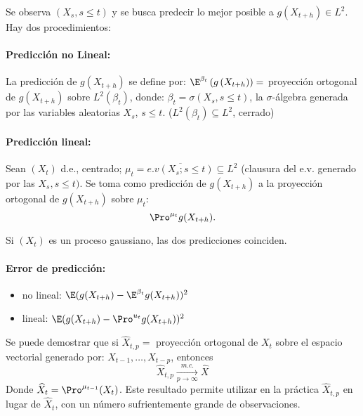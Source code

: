 Se observa $\left( {X_{s} ,s\le t} \right)$ y se busca predecir lo mejor 
posible a $g\left( {X_{t+h} } \right)\in L^{2}$. Hay dos procedimientos:

\paragraph{Predicci\'{o}n no Lineal:}
La predicci\'{o}n de $g\left( {X_{t+h} } \right)$ se define por:
$\E^{\beta_{t} }\left( {g\left( {X_{t+h} } \right)} \right)=$ 
proyecci\'{o}n ortogonal de $g\left( {X_{t+h} } \right)$ sobre $L^{2}\left( 
{\beta_{t} } \right)$, donde: $\beta_{t} =\sigma (X_{s} ,s\leq t)$, la 
$\sigma$-\'{a}lgebra generada por las variables aleatorias $X_{s} $, $s\leq 
t.$ ($L^{2}\left( {\beta_{t} } \right)\subseteq L^{2}$, cerrado)

\paragraph{Predicci\'{o}n lineal:}
Sean $(X_{t} )$ d.e., centrado; $\mu_{t} =\overline {e.v(X_{s} ;s\leq t)} 
\subseteq L^{2}$ (clausura del e.v. generado por las $X_{s} ,s\leq t)$. Se 
toma como predicci\'{o}n de $g(X_{t+h})$ a la proyecci\'{o}n 
ortogonal de $g(X_{t+h} )$ sobre $\mu_{t}$:
\[
\Pro^{\mu_{t} } g(X_{t+h} ).
\]

\begin{observacion}
 Si $(X_{t})$ es un proceso gaussiano, las dos predicciones coinciden.
\end{observacion}

\paragraph{Error de predicci\'{o}n:}
\begin{itemize}
\item no lineal: $\E(g(X_{t+h} )-\E^{\beta_{t} }g(X_{t+h} ))^{2}$
\item lineal: $\E(g(X_{t+h} )-\Pro^{u_{t} } g(X_{t+h} ))^{2}$
\end{itemize}

\begin{observacion}
Se puede demostrar que si $\widehat{X}_{t,p} 
=$ proyecci\'{o}n ortogonal de $X_{t} $ sobre el espacio vectorial 
generado por: $X_{t-1} ,\ldots,X_{t-p} $, entonces 
\[
 \widehat{X}_{t,p}\xrightarrow[p\to \infty]{m.c.} \widehat{X}
\]
Donde $\widehat{X}_{t} =\Pro^{\mu_{t-1} }(X_{t} )$. Este 
resultado permite utilizar en la pr\'{a}ctica $\widehat{X}_{t,p}$ en lugar de 
$\widehat{X}_{t}$, con un n\'{u}mero sufrientemente grande de observaciones.
\end{observacion}


